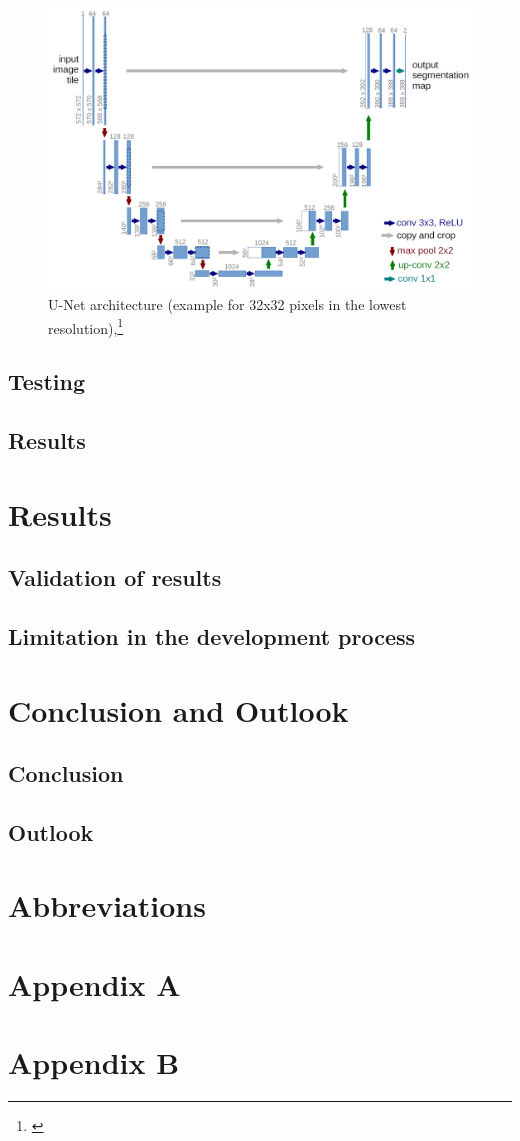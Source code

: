 \begin{figure}[h!]
	\centering
	\includegraphics[width=1\textwidth]{images/u-net-architecture.png}
	\caption{U-Net architecture (example for 32x32 pixels in the lowest resolution),\footnote{\cite{unet}}}
	\label{unet}
\end{figure}

\section{Testing}
\section{Results} 

\chapter{Results}
\section{Validation of results}
\section{Limitation in the development process}

\chapter{Conclusion and Outlook}
\section{Conclusion}
\section{Outlook}


\chapter{Abbreviations}


\printbibliography[heading=bibintoc]

\chapter{Appendix A}\label{appendix a}

\chapter{Appendix B}\label{appendix b}
%


